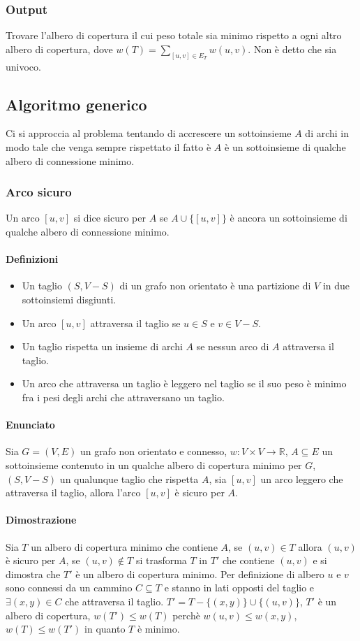 \subsubsection{Output}
Trovare l'albero di copertura il cui peso totale sia minimo rispetto a ogni altro albero di copertura, dove $w(T)=\sum\limits_{[u, v]\in E_T} w(u, v)$. Non \`e detto che sia univoco.
\subsection{Algoritmo generico}
Ci si approccia al problema tentando di accrescere un sottoinsieme $A$ di archi in modo tale che venga sempre rispettato il fatto \`e $A$ \`e un sottoinsieme di qualche albero di 
connessione minimo.
\subsubsection{Arco sicuro}
Un arco $[u, v]$ si dice sicuro per $A$ se $A\cup\{[u, v]\}$ \`e ancora un sottoinsieme di qualche albero di connessione minimo.\\

\paragraph{Definizioni}
\begin{itemize}
	\item Un taglio $(S, V - S)$ di un grafo non orientato \`e una partizione di $V$ in due sottoinsiemi disgiunti.
	\item Un arco $[u, v]$ attraversa il taglio se $u\in S$ e $v\in V-S$.
	\item Un taglio rispetta un insieme di archi $A$ se nessun arco di $A$ attraversa il taglio.
	\item Un arco che attraversa un taglio \`e leggero nel taglio se il suo peso \`e minimo fra i pesi degli archi che attraversano un taglio.
\end{itemize}
\paragraph{Enunciato}
Sia $G=(V, E)$ un grafo non orientato e connesso, $w:V\times V\rightarrow\mathbb{R}$, $A\subseteq E$ un sottoinsieme contenuto in un qualche albero di copertura minimo per $G$, 
$(S, V-S)$ un qualunque taglio che rispetta $A$, sia $[u, v]$ un arco leggero che attraversa il taglio, allora l'arco $[u, v]$ \`e sicuro per $A$. 
\paragraph{Dimostrazione}
Sia $T$ un albero di copertura minimo che contiene $A$, se $(u, v)\in T$ allora $(u, v)$ \`e sicuro per $A$, se $(u, v)\not\in T$ si trasforma $T$ in $T'$ che contiene $(u, v)$ e si 
dimostra che $T'$ \`e un albero di copertura minimo. Per definizione di albero $u$ e $v$ sono connessi da un cammino $C\subseteq T$ e stanno in lati opposti del taglio e $\exists(x, y)
\in C$ che attraversa il taglio. $T'=T-\{(x, y)\}\cup\{(u, v)\}$, $T'$ \`e un albero di copertura, $w(T')\le w(T)$ perch\`e $w(u, v)\le w(x, y)$, $w(T)\le w(T')$ in quanto $T$ \`e 
minimo.
